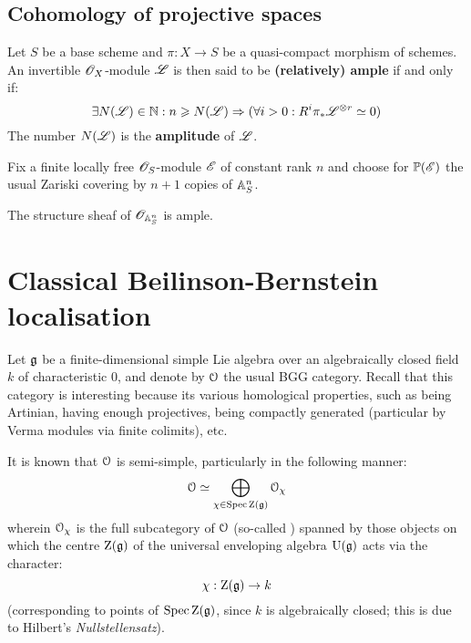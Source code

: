        \subsection{Cohomology of projective spaces}
            \begin{definition} \label{def: ample_invertible_modules}
                Let $S$ be a base scheme and $\pi: X \to S$ be a quasi-compact morphism of schemes. An invertible $\mathscr{O}_X$-module $\mathscr{L}$ is then said to be \textbf{(relatively) ample} if and only if:
                    $$\exists N(\scrL) \in \N: n \geq N(\scrL) \implies ( \forall i > 0: R^i\pi_*\scrL^{\tensor r} \cong 0 )$$
                The number $N(\mathscr{L})$ is the \textbf{amplitude} of $\mathscr{L}$.
            \end{definition}
        
            Fix a finite locally free $\mathscr{O}_S$-module $\mathscr{E}$ of constant rank $n$ and choose for $\mathbb{P}(\mathscr{E})$ the usual Zariski covering by $n + 1$ copies of $\mathbb{A}^n_S$. 
            \begin{lemma}
                The structure sheaf of $\mathscr{O}_{\mathbb{A}^n_S}$ is ample. 
            \end{lemma}


    \section{Classical Beilinson-Bernstein localisation}
        Let $\mathfrak{g}$ be a finite-dimensional simple Lie algebra over an algebraically closed field $k$ of characteristic $0$, and denote by $\mathcal{O}$ the usual BGG category. Recall that this category is interesting because its various homological properties, such as being Artinian, having enough projectives, being compactly generated (particular by Verma modules via finite colimits), etc. 

        It is known that $\mathcal{O}$ is semi-simple, particularly in the following manner:
            $$\mathcal{O} \simeq \bigoplus_{\chi \in \operatorname{Spec} \mathrm{Z}(\mathfrak{g})} \mathcal{O}_{\chi}$$
        wherein $\mathcal{O}_{\chi}$ is the full subcategory of $\mathcal{O}$ (so-called ) spanned by those objects on which the centre $\mathrm{Z}(\mathfrak{g})$ of the universal enveloping algebra $\mathrm{U}(\mathfrak{g})$ acts via the character:
            $$\chi: \mathrm{Z}(\mathfrak{g}) \to k$$
        (corresponding to points of $\operatorname{Spec} \mathrm{Z}(\mathfrak{g})$, since $k$ is algebraically closed; this is due to Hilbert's \textit{Nullstellensatz}).
        
